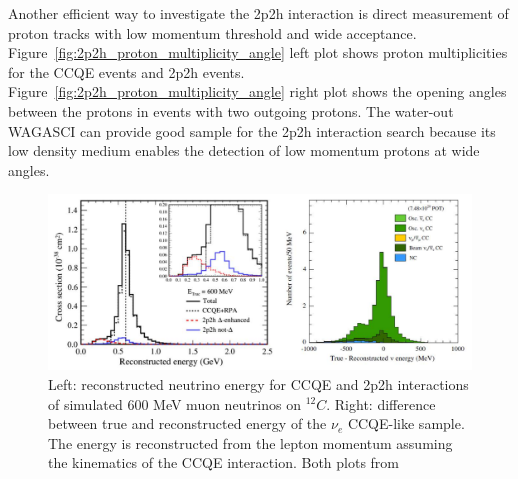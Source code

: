 Another efficient way to investigate the 2p2h interaction is direct measurement of proton tracks with low momentum threshold and wide acceptance.
Figure~\ref{fig:2p2h_proton_multiplicity_angle} left plot shows proton multiplicities for the CCQE events and 2p2h events.
Figure~\ref{fig:2p2h_proton_multiplicity_angle} right plot shows the opening angles between the protons in events with two outgoing protons.
The water-out WAGASCI can provide good sample for the 2p2h interaction search because its low density medium enables the detection of low momentum protons at wide angles.
%
%
\begin{figure}[tbhp]
\begin{center}
\includegraphics[width=\linewidth]{fig/recE.pdf}
\end{center}
\caption{Left: reconstructed neutrino energy for CCQE and 2p2h 
interactions of simulated 600 MeV muon neutrinos on $^{12}C$.
  Right: difference between true and reconstructed energy 
  of the $\nu_e$ CCQE-like sample.
  The energy is reconstructed from the lepton momentum assuming the kinematics of the CCQE interaction.
  Both plots from \cite{Abe:2017vifw}
}
\label{fig:ene_rec_bias}
\end{figure}
